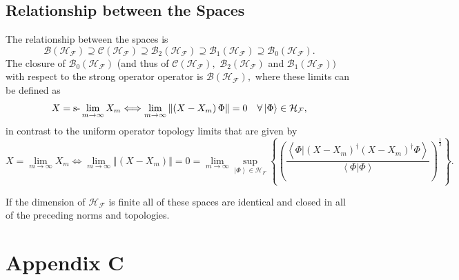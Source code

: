 \documentclass[aps,preprint]{revtex4}%
\begin{document}
\subsection{Relationship between the Spaces}

The relationship between the spaces is
\begin{equation}
\mathcal{B}\left(  \mathcal{H}_{\mathcal{F}}\right)  \supseteq\mathcal{C}%
\left(  \mathcal{H}_{\mathcal{F}}\right)  \supseteq\mathcal{B}_{2}\left(
\mathcal{H}_{\mathcal{F}}\right)  \supseteq\mathcal{B}_{1}\left(
\mathcal{H}_{\mathcal{F}}\right)  \supseteq\mathcal{B}_{0}\left(
\mathcal{H}_{\mathcal{F}}\right)  .
\end{equation}
The closure of $\mathcal{B}_{0}\left(  \mathcal{H}_{\mathcal{F}}\right)  $
(and thus of $\mathcal{C}\left(  \mathcal{H}_{\mathcal{F}}\right)  ,$
$\mathcal{B}_{2}\left(  \mathcal{H}_{\mathcal{F}}\right)  $ and $\mathcal{B}%
_{1}\left(  \mathcal{H}_{\mathcal{F}}\right)  )$ with respect to the strong
operator operator is $\mathcal{B}\left(  \mathcal{H}_{\mathcal{F}}\right)  ,$
where these limits can be defined as
\begin{equation}
X=\text{\textrm{s-}}\lim_{m\rightarrow\infty}X_{m}\Longleftrightarrow
\lim_{m\rightarrow\infty}\left\Vert \left(  X-X_{m}\right)  \Phi\right\Vert
=0\quad\forall\left\vert \Phi\right\rangle \in\mathcal{H}_{\mathcal{F}},
\end{equation}
in contrast to the uniform operator topology limits that are given by%
\begin{equation}
X=\lim_{m\rightarrow\infty}X_{m}\Longleftrightarrow\lim_{m\rightarrow\infty
}\left\Vert \left(  X-X_{m}\right)  \right\Vert =0=\lim_{m\rightarrow\infty
}\sup_{\left\vert \Phi\right\rangle \in\mathcal{H}_{F}}\left\{  \left(
\frac{\left\langle \left.  \Phi\right\vert \left(  X-X_{m}\right)  ^{\dagger
}\left(  X-X_{m}\right)  ^{\dagger}\Phi\right\rangle }{\left\langle \left.
\Phi\right\vert \Phi\right\rangle }\right)  ^{\frac{1}{2}}\right\}  .
\end{equation}


If the dimension of $\mathcal{H}_{\mathcal{F}}$ is finite all of these spaces
are identical and closed in all of the preceding norms and topologies.

\section{Appendix C \label{Projection}}
\end{document}
